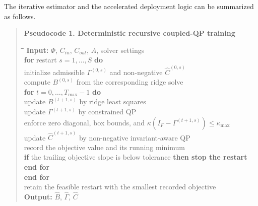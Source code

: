 \documentclass[11pt]{article}
\begin{document}
The iterative estimator and the accelerated deployment logic can be summarized as follows.

\begin{quote}
\noindent\textbf{Pseudocode 1. Deterministic recursive coupled-QP training}
\begin{tabbing}
\hspace{0.6cm}\=\hspace{0.6cm}\=\hspace{0.6cm}\=\kill
\textbf{Input:} $\Phi$, $C_{in}$, $C_{out}$, $A$, solver settings \\
\textbf{for} restart $s = 1, \dots, S$ \textbf{do} \\
\> initialize admissible $\Gamma^{(0,s)}$ and non-negative $\widehat{C}^{(0,s)}$ \\
\> compute $B^{(0,s)}$ from the corresponding ridge solve \\
\> \textbf{for} $t = 0, \dots, T_{\max}-1$ \textbf{do} \\
\>\> update $B^{(t+1,s)}$ by ridge least squares \\
\>\> update $\Gamma^{(t+1,s)}$ by constrained QP \\
\>\> enforce zero diagonal, box bounds, and $\kappa(I_F - \Gamma^{(t+1,s)}) \le \kappa_{\max}$ \\
\>\> update $\widehat{C}^{(t+1,s)}$ by non-negative invariant-aware QP \\
\>\> record the objective value and its running minimum \\
\>\> \textbf{if} the trailing objective slope is below tolerance \textbf{then stop the restart} \\
\> \textbf{end for} \\
\textbf{end for} \\
retain the feasible restart with the smallest recorded objective \\
\textbf{Output:} $\widehat{B}$, $\widehat{\Gamma}$, $\widehat{C}$
\end{tabbing}
\end{quote}
\end{document}
